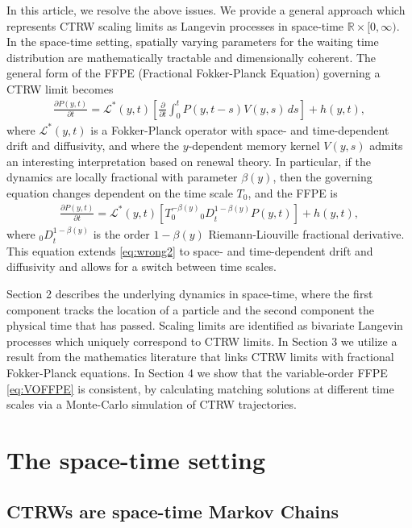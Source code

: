 \documentclass[a4paper,12pt]{elsarticle}
\numberwithin{equation}{section}
\theoremstyle{plain}
\theoremstyle{definition}
\theoremstyle{remark}
\numberwithin{equation}{section}
\newcommand{\spc}{\mathbb R}
\newcommand{\spctim}{\spc \times [0,\infty)}
\newcommand{\1}{\mathbf 1}
\newcommand{\del}{\partial}
\begin{document}
In this article, we resolve the above issues. We provide a general 
approach
which represents CTRW scaling limits as Langevin processes in space-time
$\spctim$.  In the space-time setting, spatially varying parameters for the
waiting time distribution are mathematically tractable and dimensionally
coherent.  The general form of the FFPE (Fractional Fokker-Planck Equation)
governing a CTRW limit becomes
\begin{align}
\frac{\del P(y,t)}{\del t} = \mathcal L^*(y,t) \left[ \frac{\partial}{\partial t}
\int_0^t P(y,t-s) V(y,s)\,ds \right] + h(y,t),
\end{align}
where $\mathcal L^*(y,t)$ is a Fokker-Planck operator with space- and
time-dependent drift and diffusivity, and
where the $y$-dependent memory kernel $V(y,s)$ admits an interesting 
interpretation
based on renewal theory.  In particular, if the dynamics are locally fractional
with parameter $\beta(y)$, then the governing equation changes dependent on the 
time scale $T_0$, and the FFPE is
\begin{align} \label{eq:VOFFPE}
\frac{\del P(y,t)}{\del t}
= \mathcal L^*(y,t) \left[ T_0^{-\beta(y)} {_0 D}_t^{1-\beta(y)} P(y,t) \right] + h(y,t),
\end{align}
where ${_0 D}_t^{1-\beta(y)}$ is the order $1-\beta(y)$ Riemann-Liouville
fractional derivative.  This equation extends \eqref{eq:wrong2} to
space- and time-dependent drift and diffusivity and allows for a switch
between time scales.


Section 2 describes the underlying dynamics in space-time, where the first
component tracks the location of a particle and the second component the
physical time that has passed.  Scaling limits are identified as bivariate
Langevin processes which uniquely correspond to CTRW limits.
In Section 3 we utilize a result from the mathematics literature that links CTRW 
limits with fractional Fokker-Planck equations.
In Section 4 we show that the variable-order FFPE \eqref{eq:VOFFPE} is consistent, by  calculating matching solutions at different time scales via a Monte-Carlo simulation of CTRW trajectories.


\section{The space-time setting}

\subsection{CTRWs are space-time Markov Chains}
\end{document}
